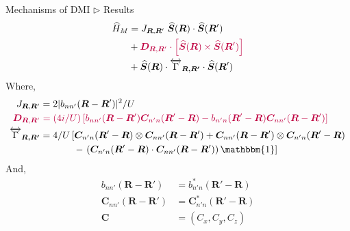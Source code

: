 \documentclass{beamer}
\newcommand{\purple}{\textcolor{purple}}
\begin{document}
  \begin{frame}{Mechanisms of DMI \(\rhd\) Results}
    \small
    \begin{equation}\begin{aligned}
      \widehat{H}_{M} &= J_{\bm{R},\bm{R}'}\;\widehat{\bm{S}}(\bm{R})\cdot\widehat{\bm{S}}(\bm{R}') \\
      &+ \purple{\bm{D}_{\bm{R},\bm{R}'}\cdot\left[\widehat{\bm{S}}(\bm{R})\times\widehat{\bm{S}}(\bm{R}')\right]} \\
      &+ \widehat{\bm{S}}(\bm{R})\cdot\overleftrightarrow\Gamma_{\bm{\bm{R},\bm{R}'}}\cdot\widehat{\bm{S}}(\bm{R}')
    \end{aligned}\end{equation}
    \scriptsize
    Where, 
    \begin{subequations}\begin{align}
      J_{\bm{R},\bm{R}'} &= 2|b_{nn'}(\bm{R}-\bm{R}')|^2/U\\
      \purple{\bm{D}_{\bm{R},\bm{R}'}} &\hspace*{0.3em}\purple{= (4i/U)\left[b_{nn'}(\bm{R}-\bm{R}')\bm{C}_{n'n}(\bm{R}'-\bm{R}) - b_{n'n}(\bm{R}'-\bm{R})\bm{C}_{nn'}(\bm{R}-\bm{R}')\right]}\\
      \overleftrightarrow\Gamma_{\bm{\bm{R},\bm{R}'}} &= 4/U\left[\bm{C}_{n'n}(\bm{R}'-\bm{R})\otimes\bm{C}_{nn'}(\bm{R}-\bm{R}') + \bm{C}_{nn'}(\bm{R}-\bm{R}')\otimes\bm{C}_{n'n}(\bm{R}'-\bm{R})\right. \nonumber \\
      &\hspace*{3.5em}- \left.\left(\bm{C}_{n'n}(\bm{R}'-\bm{R})\cdot\bm{C}_{nn'}(\bm{R}-\bm{R}')\right)\mathbbm{1}\right]
    \end{align}\end{subequations}
    And,
    \begin{equation}
      \begin{aligned}
        b_{nn'}(\bm{R}-\bm{R}') &= b_{n'n}^*(\bm{R}'-\bm{R})\\
        \bm{C}_{nn'}(\bm{R}-\bm{R}') &= \bm{C}_{n'n}^*(\bm{R}'-\bm{R})\\
        \bm{C} &= (C_x, C_y, C_z)
      \end{aligned}
    \end{equation}
  \end{frame}
\end{document}
